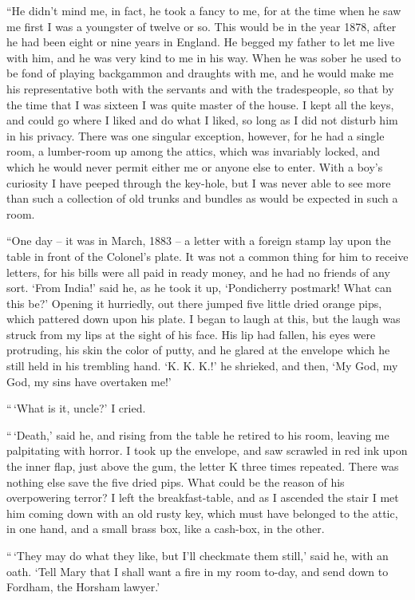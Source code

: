 “He didn’t mind me, in fact, he took a fancy to me, for at
the time when he saw me first I was a youngster of twelve or
so. This would be in the year 1878, after he had been eight
or nine years in England. He begged my father to let me
live with him, and he was very kind to me in his way. When
he was sober he used to be fond of playing backgammon and
draughts with me, and he would make me his representative
both with the servants and with the tradespeople, so that by
the time that I was sixteen I was quite master of the house.
I kept all the keys, and could go where I liked and do what I
liked, so long as I did not disturb him in his privacy. There
was one singular exception, however, for he had a single room,
a lumber-room up among the attics, which was invariably
locked, and which he would never permit either me or anyone
else to enter. With a boy’s curiosity I have peeped through
the key-hole, but I was never able to see more than such a
collection of old trunks and bundles as would be expected in
such a room.

“One day -- it was in March, 1883 -- a letter with a foreign
stamp lay upon the table in front of the Colonel’s plate. It
was not a common thing for him to receive letters, for his bills
were all paid in ready money, and he had no friends of any
sort. ‘From India!’ said he, as he took it up, ‘Pondicherry
postmark! What can this be?’ Opening it hurriedly, out
there jumped five little dried orange pips, which pattered
down upon his plate. I began to laugh at this, but the laugh
was struck from my lips at the sight of his face. His lip had
fallen, his eyes were protruding, his skin the color of putty,
and he glared at the envelope which he still held in his trembling
hand. ‘K. K. K.!’ he shrieked, and then, ‘My God, my
God, my sins have overtaken me!’

“\,‘What is it, uncle?’ I cried.

“\,‘Death,’ said he, and rising from the table he retired to
his room, leaving me palpitating with horror. I took up the
envelope, and saw scrawled in red ink upon the inner flap,
just above the gum, the letter K three times repeated. There
was nothing else save the five dried pips. What could be the
reason of his overpowering terror? I left the breakfast-table,
and as I ascended the stair I met him coming down with an
old rusty key, which must have belonged to the attic, in one
hand, and a small brass box, like a cash-box, in the other.

“\,‘They may do what they like, but I’ll checkmate them
still,’ said he, with an oath. ‘Tell Mary that I shall want a
fire in my room to-day, and send down to Fordham, the Horsham
lawyer.’

